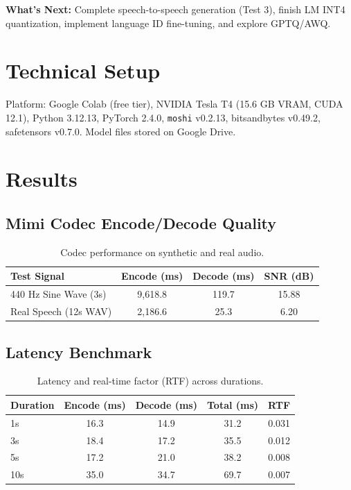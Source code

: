 \documentclass[11pt]{article}
\begin{document}
\textbf{What's Next:} Complete speech-to-speech generation (Test 3), finish LM INT4 quantization, implement language ID fine-tuning, and explore GPTQ/AWQ.

\section{Technical Setup}
Platform: Google Colab (free tier), NVIDIA Tesla T4 (15.6 GB VRAM, CUDA 12.1), Python 3.12.13, PyTorch 2.4.0, \texttt{moshi} v0.2.13, bitsandbytes v0.49.2, safetensors v0.7.0. Model files stored on Google Drive.

\section{Results}

\subsection{Mimi Codec Encode/Decode Quality}
\begin{table}[H]
\centering
\caption{Codec performance on synthetic and real audio.}
\label{tab:codec_quality}
\begin{tabular}{@{}lccc@{}}
\toprule
\textbf{Test Signal} & \textbf{Encode (ms)} & \textbf{Decode (ms)} & \textbf{SNR (dB)} \\
\midrule
440 Hz Sine Wave (3s) & 9,618.8 & 119.7 & 15.88 \\
Real Speech (12s WAV) & 2,186.6 & 25.3 & 6.20 \\
\bottomrule
\end{tabular}
\end{table}

\subsection{Latency Benchmark}
\begin{table}[H]
\centering
\caption{Latency and real-time factor (RTF) across durations.}
\label{tab:latency}
\begin{tabular}{@{}lcccc@{}}
\toprule
\textbf{Duration} & \textbf{Encode (ms)} & \textbf{Decode (ms)} & \textbf{Total (ms)} & \textbf{RTF} \\
\midrule
1s & 16.3 & 14.9 & 31.2 & 0.031 \\
3s & 18.4 & 17.2 & 35.5 & 0.012 \\
5s & 17.2 & 21.0 & 38.2 & 0.008 \\
10s & 35.0 & 34.7 & 69.7 & 0.007 \\
\bottomrule
\end{tabular}
\end{table}
\end{document}
